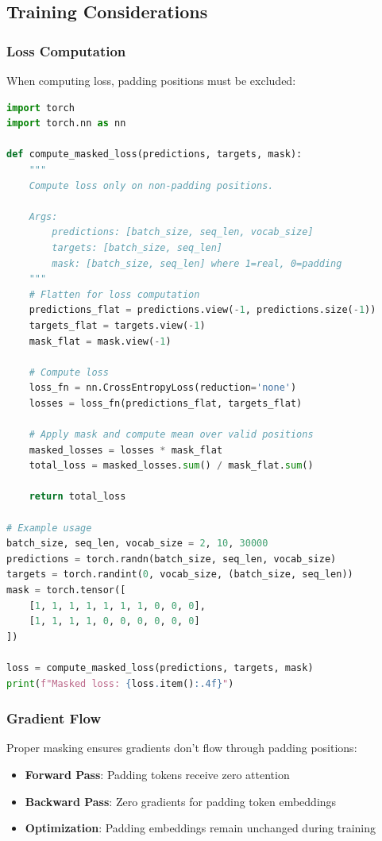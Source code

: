 \subsection{Training Considerations}

\subsubsection{Loss Computation}
When computing loss, padding positions must be excluded:

\begin{example}
\begin{lstlisting}[language=Python]
import torch
import torch.nn as nn

def compute_masked_loss(predictions, targets, mask):
    """
    Compute loss only on non-padding positions.
    
    Args:
        predictions: [batch_size, seq_len, vocab_size]
        targets: [batch_size, seq_len]
        mask: [batch_size, seq_len] where 1=real, 0=padding
    """
    # Flatten for loss computation
    predictions_flat = predictions.view(-1, predictions.size(-1))
    targets_flat = targets.view(-1)
    mask_flat = mask.view(-1)
    
    # Compute loss
    loss_fn = nn.CrossEntropyLoss(reduction='none')
    losses = loss_fn(predictions_flat, targets_flat)
    
    # Apply mask and compute mean over valid positions
    masked_losses = losses * mask_flat
    total_loss = masked_losses.sum() / mask_flat.sum()
    
    return total_loss

# Example usage
batch_size, seq_len, vocab_size = 2, 10, 30000
predictions = torch.randn(batch_size, seq_len, vocab_size)
targets = torch.randint(0, vocab_size, (batch_size, seq_len))
mask = torch.tensor([
    [1, 1, 1, 1, 1, 1, 1, 0, 0, 0],
    [1, 1, 1, 1, 0, 0, 0, 0, 0, 0]
])

loss = compute_masked_loss(predictions, targets, mask)
print(f"Masked loss: {loss.item():.4f}")
\end{lstlisting}
\end{example}

\subsubsection{Gradient Flow}
Proper masking ensures gradients don't flow through padding positions:
\begin{itemize}
\item \textbf{Forward Pass}: Padding tokens receive zero attention
\item \textbf{Backward Pass}: Zero gradients for padding token embeddings
\item \textbf{Optimization}: Padding embeddings remain unchanged during training
\end{itemize}

